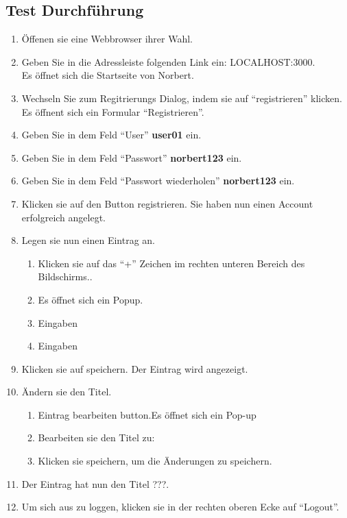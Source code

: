 \subsection{Test Durchführung}
\begin{enumerate}
\item Öffenen sie eine Webbrowser ihrer Wahl.
\item Geben Sie in die Adressleiste folgenden Link ein: LOCALHOST:3000. \\Es öffnet sich die Startseite von Norbert.
\item Wechseln Sie zum Regitrierungs Dialog, indem sie auf \enquote{registrieren} klicken. Es öffnent sich ein Formular \enquote{Registrieren}.
\item Geben Sie in dem Feld \enquote{User} \textbf{user01} ein.
\item Geben Sie in dem Feld \enquote{Passwort} \textbf{norbert123} ein.
\item Geben Sie in dem Feld \enquote{Passwort wiederholen} \textbf{norbert123} ein.
\item Klicken sie auf den Button registrieren. Sie haben nun einen Account erfolgreich angelegt.
\item Legen sie nun einen Eintrag an.
\begin{enumerate}
\item Klicken sie auf das \enquote{+} Zeichen im rechten unteren Bereich des Bildschirms..
\item Es öffnet sich ein Popup.
\item Eingaben
\item Eingaben
\end{enumerate}
\item Klicken sie auf speichern. Der Eintrag wird angezeigt.
\item Ändern sie den Titel.
\begin{enumerate}
\item Eintrag bearbeiten button.Es öffnet sich ein Pop-up
\item Bearbeiten sie den Titel zu: 
\item Klicken sie speichern, um die Änderungen zu speichern.
\end{enumerate}
\item Der Eintrag hat nun den Titel ???.
\item Um sich aus zu loggen, klicken sie in der rechten oberen Ecke auf \enquote{Logout}.
\end{enumerate}

